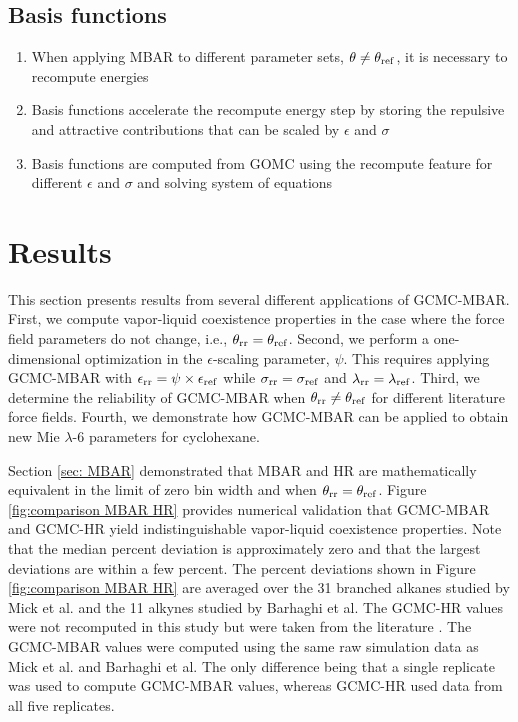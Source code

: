 \documentclass[journal=jced,manuscript=article]{achemso}
\begin{document}
\subsection{Basis functions} \label{sec: Basis functions}

\begin{enumerate}
	\item When applying MBAR to different parameter sets, $\theta \neq \theta_{\rm ref}$, it is necessary to recompute energies
	\item Basis functions accelerate the recompute energy step by storing the repulsive and attractive contributions that can be scaled by $\epsilon$ and $\sigma$
	\item Basis functions are computed from GOMC using the recompute feature for different $\epsilon$ and $\sigma$ and solving system of equations
\end{enumerate}

\section{Results} \label{sec: Results}

This section presents results from several different applications of GCMC-MBAR. First, we compute vapor-liquid coexistence properties in the case where the force field parameters do not change, i.e., $\theta_{\rm rr} = \theta_{\rm ref}$. Second, we perform a one-dimensional optimization in the $\epsilon$-scaling parameter, $\psi$. This requires applying GCMC-MBAR with $\epsilon_{\rm rr} = \psi \times \epsilon_{\rm ref}$ while $\sigma_{\rm rr} = \sigma_{\rm ref}$ and $\lambda_{\rm rr} = \lambda_{\rm ref}$. Third, we determine the reliability of GCMC-MBAR when $\theta_{\rm rr} \neq \theta_{\rm ref}$ for different literature force fields. Fourth, we demonstrate how GCMC-MBAR can be applied to obtain new Mie $\lambda$-6 parameters for cyclohexane.

Section \ref{sec: MBAR} demonstrated that MBAR and HR are mathematically equivalent in the limit of zero bin width and when $\theta_{\rm rr} = \theta_{\rm ref}$. Figure \ref{fig:comparison MBAR HR} provides numerical validation that GCMC-MBAR and GCMC-HR yield indistinguishable vapor-liquid coexistence properties. Note that the median percent deviation is approximately zero and that the largest deviations are within a few percent. The percent deviations shown in Figure \ref{fig:comparison MBAR HR} are averaged over the 31 branched alkanes studied by Mick et al. and the 11 alkynes studied by Barhaghi et al. The GCMC-HR values were not recomputed in this study but were taken from the literature \cite{Potoff_branched,Barhaghi2017}. The GCMC-MBAR values were computed using the same raw simulation data as Mick et al. and Barhaghi et al. The only difference being that a single replicate was used to compute GCMC-MBAR values, whereas GCMC-HR used data from all five replicates. 
\end{document}
